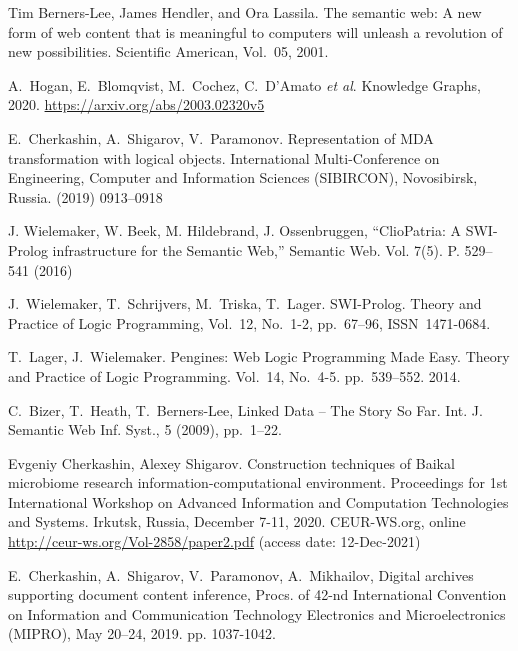 \documentclass[
]{ceurart}
\begin{document}
\begin{thebibliography}{99}


 Tim Berners-Lee, James Hendler, and Ora Lassila.  The semantic web: A new form of web content that is meaningful to computers will unleash a revolution of new possibilities.  Scientific American, Vol.~05, 2001.

 A.~Hogan, E.~Blomqvist, M.~Cochez, C.~D’Amato \emph{et al}. Knowledge Graphs, 2020. \url{https://arxiv.org/abs/2003.02320v5}

 E.~Cherkashin, A.~Shigarov, V.~Paramonov. Representation of MDA transformation with logical objects.  International Multi-Conference on Engineering, Computer and Information Sciences (SIBIRCON), Novosibirsk, Russia. (2019) 0913--0918 

 J. Wielemaker, W. Beek, M. Hildebrand, J. Ossenbruggen, ``ClioPatria: A
  SWI-Prolog infrastructure for the Semantic Web,'' Semantic Web.
  Vol. 7(5).  P. 529--541 (2016) 

 J.~Wielemaker, T.~Schrijvers, M.~Triska, T.~Lager. SWI-Prolog. Theory and Practice of Logic Programming, Vol.~12, No.~1-2, pp.~67--96, ISSN~1471-0684.

 T.~Lager, J.~Wielemaker. Pengines: Web Logic Programming Made Easy.  Theory and Practice of Logic Programming.  Vol.~14, No.~4-5. pp.~539--552. 2014. 

 C.~Bizer, T.~Heath, T.~Berners-Lee, Linked Data -- The Story So Far.  Int. J. Semantic Web Inf. Syst., 5 (2009), pp.~1--22. 

 Evgeniy Cherkashin, Alexey Shigarov. Construction techniques of Baikal microbiome research information-computational environment.  Proceedings for 1st International Workshop on Advanced Information and Computation Technologies and Systems. Irkutsk, Russia, December 7-11, 2020. CEUR-WS.org, online \url{http://ceur-ws.org/Vol-2858/paper2.pdf} (access date: 12-Dec-2021)

 E.~Cherkashin, A.~Shigarov, V.~Paramonov, A.~Mikhailov, Digital archives supporting document content inference, Procs.  of 42-nd International Convention on Information and Communication Technology Electronics and Microelectronics (MIPRO), May 20–24, 2019.  pp. 1037-1042. 


\end{thebibliography}
\end{document}
